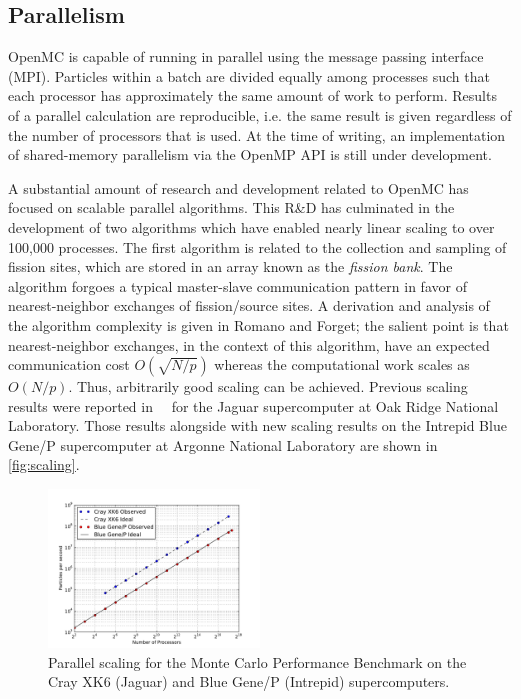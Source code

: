 \documentclass{snamc2013}
\begin{document}
\subsection{Parallelism}

OpenMC is capable of running in parallel using the message passing interface
(MPI). Particles within a batch are divided equally among processes such that
each processor has approximately the same amount of work to perform. Results of
a parallel calculation are reproducible, i.e. the same result is given
regardless of the number of processors that is used. At the time of writing, an
implementation of shared-memory parallelism via the OpenMP API is still under
development.

A substantial amount of research and development related to OpenMC has focused
on scalable parallel algorithms. This R\&D has culminated in the development of
two algorithms which have enabled nearly linear scaling to over 100,000
processes. The first algorithm is related to the collection and sampling of
fission sites, which are stored in an array known as the \textit{fission
  bank}. The algorithm forgoes a typical master-slave communication pattern in
favor of nearest-neighbor exchanges of fission/source sites. A derivation and
analysis of the algorithm complexity is given in Romano and
Forget\cite{nse-romano-2012}; the salient point is that nearest-neighbor
exchanges, in the context of this algorithm, have an expected communication cost
$O(\sqrt{N/p})$ whereas the computational work scales as $O(N/p)$. Thus,
arbitrarily good scaling can be achieved. Previous scaling results were reported
in~~\cite{ane-romano-2013} for the Jaguar supercomputer at Oak Ridge National
Laboratory. Those results alongside with new scaling results on the Intrepid
Blue Gene/P supercomputer at Argonne National Laboratory are shown in
\autoref{fig:scaling}.
\begin{figure}[htb]
  \centering
  \includegraphics[width=0.5\textwidth]{images/scaling_loglog.pdf}
  \caption{Parallel scaling for the Monte Carlo Performance Benchmark on the
    Cray XK6 (Jaguar) and Blue Gene/P (Intrepid) supercomputers.}
  \label{fig:scaling}
\end{figure}
\end{document}

